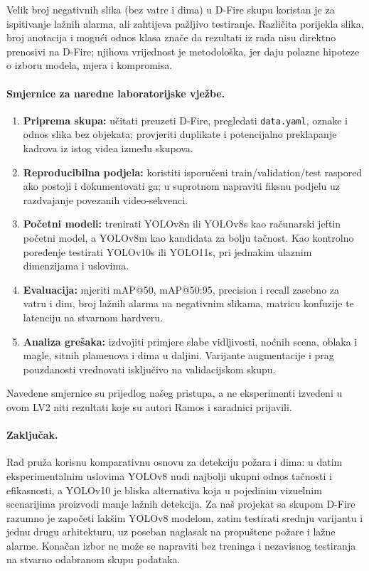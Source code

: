 Velik broj negativnih slika (bez vatre i dima) u D-Fire skupu koristan je za ispitivanje lažnih alarma, ali zahtijeva pažljivo testiranje. Različita porijekla slika, broj anotacija i mogući odnos klasa znače da rezultati iz rada nisu direktno prenosivi na D-Fire; njihova vrijednost je metodološka, jer daju polazne hipoteze o izboru modela, mjera i kompromisa.

\paragraph{Smjernice za naredne laboratorijske vježbe.}
\begin{enumerate}
  \item \textbf{Priprema skupa:} učitati preuzeti D-Fire, pregledati \texttt{data.yaml}, oznake i odnos slika bez objekata; provjeriti duplikate i potencijalno preklapanje kadrova iz istog videa između skupova.
  \item \textbf{Reproducibilna podjela:} koristiti isporučeni train/validation/test raspored ako postoji i dokumentovati ga; u suprotnom napraviti fiksnu podjelu uz razdvajanje povezanih video-sekvenci.
  \item \textbf{Početni modeli:} trenirati YOLOv8n ili YOLOv8s kao računarski jeftin početni model, a YOLOv8m kao kandidata za bolju tačnost. Kao kontrolno poređenje testirati YOLOv10s ili YOLO11s, pri jednakim ulaznim dimenzijama i uslovima.
  \item \textbf{Evaluacija:} mjeriti mAP@50, mAP@50:95, precision i recall zasebno za vatru i dim, broj lažnih alarma na negativnim slikama, matricu konfuzije te latenciju na stvarnom hardveru.
  \item \textbf{Analiza grešaka:} izdvojiti primjere slabe vidljivosti, noćnih scena, oblaka i magle, sitnih plamenova i dima u daljini. Varijante augmentacije i prag pouzdanosti vrednovati isključivo na validacijskom skupu.
\end{enumerate}
Navedene smjernice su prijedlog našeg pristupa, a ne eksperimenti izvedeni u ovom LV2 niti rezultati koje su autori Ramos i saradnici prijavili.

\paragraph{Zaključak.} Rad pruža korisnu komparativnu osnovu za detekciju požara i dima: u datim eksperimentalnim uslovima YOLOv8 nudi najbolji ukupni odnos tačnosti i efikasnosti, a YOLOv10 je bliska alternativa koja u pojedinim vizuelnim scenarijima proizvodi manje lažnih detekcija. Za naš projekat sa skupom D-Fire razumno je započeti lakšim YOLOv8 modelom, zatim testirati srednju varijantu i jednu drugu arhitekturu, uz poseban naglasak na propuštene požare i lažne alarme. Konačan izbor ne može se napraviti bez treninga i nezavisnog testiranja na stvarno odabranom skupu podataka.


